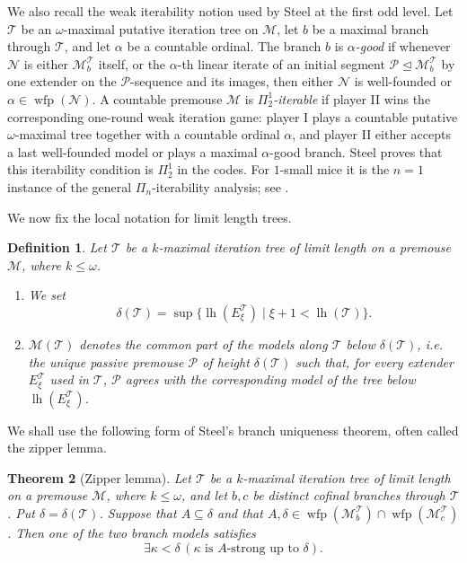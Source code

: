 \documentclass[a4paper,11pt]{article}
\newtheorem{theorem}{Theorem}[section]
\newtheorem{definition}[theorem]{Definition}
\begin{document}
We also recall the weak iterability notion used by Steel at the first odd level.  Let $\mathcal T$ be an $\omega$-maximal putative iteration tree on $\mathcal M$, let $b$ be a maximal branch through $\mathcal T$, and let $\alpha$ be a countable ordinal.  The branch $b$ is \emph{$\alpha$-good} if whenever $\mathcal N$ is either $\mathcal M_b^{\mathcal T}$ itself, or the $\alpha$-th linear iterate of an initial segment $\mathcal P\trianglelefteq \mathcal M_b^{\mathcal T}$ by one extender on the $\mathcal P$-sequence and its images, then either $\mathcal N$ is well-founded or $\alpha\in\operatorname{wfp}(\mathcal N)$.  A countable premouse $\mathcal M$ is \emph{$\Pi^1_2$-iterable} if player II wins the corresponding one-round weak iteration game: player I plays a countable putative $\omega$-maximal tree together with a countable ordinal $\alpha$, and player II either accepts a last well-founded model or plays a maximal $\alpha$-good branch.  Steel proves that this iterability condition is $\Pi^1_2$ in the codes.  For $1$-small mice it is the $n=1$ instance of the general $\Pi_n$-iterability analysis; see \cite[Lemma~1.7]{Steel2}.

We now fix the local notation for limit length trees.

\begin{definition}\label{def:delta-common-part}
Let $\mathcal T$ be a $k$-maximal iteration tree of limit length on a premouse $\mathcal M$, where $k\leq\omega$.
\begin{enumerate}
   \item We set
   \[
      \delta(\mathcal T)=
      \sup\{\operatorname{lh}(E_\xi^{\mathcal T})\mid
             \xi+1<\operatorname{lh}(\mathcal T)\}.
   \]
   \item $\mathcal M(\mathcal T)$ denotes the common part of the models along $\mathcal T$ below $\delta(\mathcal T)$, i.e. the unique passive premouse $\mathcal P$ of height $\delta(\mathcal T)$ such that, for every extender $E_\xi^{\mathcal T}$ used in $\mathcal T$, $\mathcal P$ agrees with the corresponding model of the tree below $\operatorname{lh}(E_\xi^{\mathcal T})$.
\end{enumerate}
\end{definition}

We shall use the following form of Steel's branch uniqueness theorem, often called the zipper lemma.

\begin{theorem}[Zipper lemma]\label{thm:zipper-local}
Let $\mathcal T$ be a $k$-maximal iteration tree of limit length on a premouse $\mathcal M$, where $k\leq\omega$, and let $b,c$ be distinct cofinal branches through $\mathcal T$.  Put $\delta=\delta(\mathcal T)$.  Suppose that $A\subseteq\delta$ and that $A,\delta\in\operatorname{wfp}(\mathcal M_b^{\mathcal T})\cap\operatorname{wfp}(\mathcal M_c^{\mathcal T})$.  Then one of the two branch models satisfies
\[
   \exists\kappa<\delta\,
   (\kappa\text{ is }A\text{-strong up to }\delta).
\]
\end{theorem}
\end{document}
